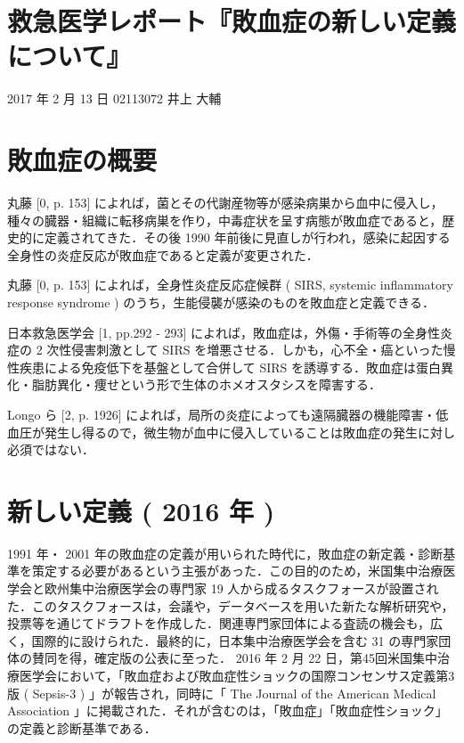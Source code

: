 \documentclass[10pt,uplatex]{jsarticle}
\begin{document}
\section*{救急医学レポート『敗血症の新しい定義について』}

\begin{flushright}
2017 年 2 月 13 日 02113072 井上 大輔
\end{flushright}

\section{敗血症の概要}

丸藤 [0, p. 153] によれば，菌とその代謝産物等が感染病巣から血中に侵入し，種々の臓器・組織に転移病巣を作り，中毒症状を呈す病態が敗血症であると，歴史的に定義されてきた．その後 1990 年前後に見直しが行われ，感染に起因する全身性の炎症反応が敗血症であると定義が変更された．

丸藤 [0, p. 153] によれば，全身性炎症反応症候群 ( SIRS, systemic inflammatory response syndrome ) のうち，生能侵襲が感染のものを敗血症と定義できる．

日本救急医学会 [1, pp.292 - 293] によれば，敗血症は，外傷・手術等の全身性炎症の 2 次性侵害刺激として SIRS を増悪させる．しかも，心不全・癌といった慢性疾患による免疫低下を基盤として合併して SIRS を誘導する．敗血症は蛋白異化・脂肪異化・痩せという形で生体のホメオスタシスを障害する．

Longo ら [2, p. 1926] によれば，局所の炎症によっても遠隔臓器の機能障害・低血圧が発生し得るので，微生物が血中に侵入していることは敗血症の発生に対し必須ではない．

\section{新しい定義 ( 2016 年 )}

1991 年・ 2001 年の敗血症の定義が用いられた時代に，敗血症の新定義・診断基準を策定する必要があるという主張があった．この目的のため，米国集中治療医学会と欧州集中治療医学会の専門家 19 人から成るタスクフォースが設置された．このタスクフォースは，会議や，データベースを用いた新たな解析研究や，投票等を通じてドラフトを作成した．関連専門家団体による査読の機会も，広く，国際的に設けられた．最終的に，日本集中治療医学会を含む 31 の専門家団体の賛同を得，確定版の公表に至った． 2016 年 2 月 22 日，第45回米国集中治療医学会において，「敗血症および敗血症性ショックの国際コンセンサス定義第3版 ( Sepsis-3 ) 」が報告され，同時に「 The Journal of the American Medical Association 」に掲載された．それが含むのは，「敗血症」「敗血症性ショック」の定義と診断基準である．
\end{document}
